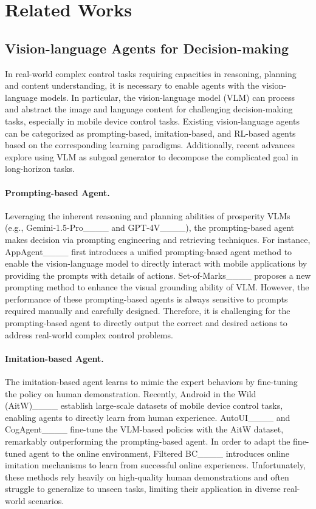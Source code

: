 \section{Related Works}
\label{sec:related_works}

\subsection{Vision-language Agents for Decision-making}
In real-world complex control tasks requiring capacities in reasoning, planning and content understanding, it is necessary to enable agents with the vision-language models.
In particular, the vision-language model (VLM) can process and abstract the image and language content for challenging decision-making tasks, especially in mobile device control tasks.
Existing vision-language agents can be categorized as prompting-based, imitation-based, and RL-based agents based on the corresponding learning paradigms.
Additionally, recent advances explore using VLM as subgoal generator to decompose the complicated goal in long-horizon tasks.

\paragraph{Prompting-based Agent.}
Leveraging the inherent reasoning and planning abilities of prosperity VLMs (e.g., Gemini-1.5-Pro____ and GPT-4V____), the prompting-based agent makes decision via prompting engineering and retrieving techniques.
For instance, AppAgent____ first introduces a unified prompting-based agent method to enable the vision-language model to directly interact with mobile applications by providing the prompts with details of actions.
Set-of-Marks____ proposes a new prompting method to enhance the visual grounding ability of VLM.
However, the performance of these prompting-based agents is always sensitive to prompts required manually and carefully designed.
Therefore, it is challenging for the prompting-based agent to directly output the correct and desired actions to address real-world complex control problems.

\paragraph{Imitation-based Agent.}
The imitation-based agent learns to mimic the expert behaviors by fine-tuning the policy on human demonstration.
Recently, Android in the Wild (AitW)____ establish large-scale datasets of mobile device control tasks, enabling agents to directly learn from human experience.
AutoUI____ and CogAgent____ fine-tune the VLM-based policies with the AitW dataset, remarkably outperforming the prompting-based agent.
In order to adapt the fine-tuned agent to the online environment, Filtered BC____ introduces online imitation mechanisms to learn from successful online experiences. 
Unfortunately, these methods rely heavily on high-quality human demonstrations and often struggle to generalize to unseen tasks, limiting their application in diverse real-world scenarios.


